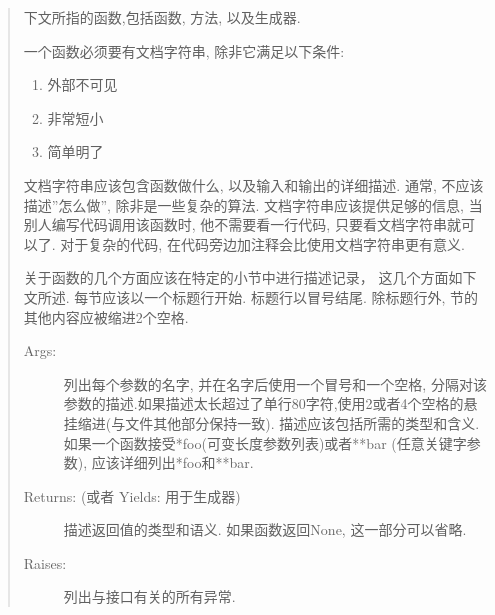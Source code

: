 \documentclass[a4paper,10pt,english]{sphinxmanual}
\begin{document}
\begin{quote}

下文所指的函数,包括函数, 方法, 以及生成器.

一个函数必须要有文档字符串, 除非它满足以下条件:
\begin{enumerate}
\item {} 
外部不可见

\item {} 
非常短小

\item {} 
简单明了

\end{enumerate}

文档字符串应该包含函数做什么, 以及输入和输出的详细描述. 通常, 不应该描述”怎么做”, 除非是一些复杂的算法. 文档字符串应该提供足够的信息, 当别人编写代码调用该函数时, 他不需要看一行代码, 只要看文档字符串就可以了. 对于复杂的代码, 在代码旁边加注释会比使用文档字符串更有意义.

关于函数的几个方面应该在特定的小节中进行描述记录， 这几个方面如下文所述. 每节应该以一个标题行开始. 标题行以冒号结尾. 除标题行外, 节的其他内容应被缩进2个空格.
\begin{description}
\item[{Args:}] \leavevmode
列出每个参数的名字, 并在名字后使用一个冒号和一个空格, 分隔对该参数的描述.如果描述太长超过了单行80字符,使用2或者4个空格的悬挂缩进(与文件其他部分保持一致).
描述应该包括所需的类型和含义.
如果一个函数接受*foo(可变长度参数列表)或者**bar (任意关键字参数), 应该详细列出*foo和**bar.

\item[{Returns: (或者 Yields: 用于生成器)}] \leavevmode
描述返回值的类型和语义. 如果函数返回None, 这一部分可以省略.

\item[{Raises:}] \leavevmode
列出与接口有关的所有异常.

\end{description}

%
\begin{sphinxVerbatim}[commandchars=\\\{\}]
   



\end{sphinxVerbatim}
\end{quote}
\end{document}
